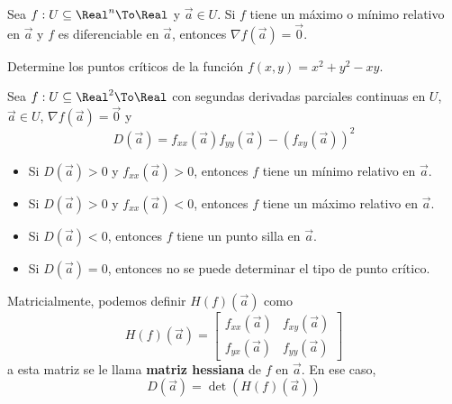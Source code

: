 \begin{frame}
  \begin{thm}
    Sea $f:U\subseteq\Real^n\To\Real$ y $\vec{a}\in U$. Si $f$ tiene un máximo o mínimo relativo en $\vec{a}$ y $f$ es diferenciable en $\vec{a}$, entonces $\nabla f(\vec{a})=\vec{0}$.
  \end{thm}
\end{frame}

\begin{frame}
  \begin{eg}
    Determine los puntos críticos de la función $f(x,y)=x^2+y^2-xy$.
  \end{eg}
\end{frame}

\begin{frame}
  \begin{thm}
    Sea $f:U\subseteq\Real^2\To\Real$ con segundas derivadas parciales continuas en $U$, $\vec{a}\in U$, $\nabla f(\vec{a})=\vec{0}$ y
      $$D(\vec{a})=f_{xx}(\vec{a})f_{yy}(\vec{a})-(f_{xy}(\vec{a}))^2$$
    \begin{itemize}
      \item<2-> Si $D(\vec{a})>0$ y $f_{xx}(\vec{a})>0$, entonces $f$ tiene un mínimo relativo en $\vec{a}$.
      \item<3-> Si $D(\vec{a})>0$ y $f_{xx}(\vec{a})<0$, entonces $f$ tiene un máximo relativo en $\vec{a}$.
      \item<4-> Si $D(\vec{a})<0$, entonces $f$ tiene un punto silla en $\vec{a}$.
      \item<5-> Si $D(\vec{a})=0$, entonces no se puede determinar el tipo de punto crítico.
    \end{itemize}
  \end{thm}
\end{frame}

\begin{frame}
  \begin{rem}
    Matricialmente, podemos definir $H(f)(\vec{a})$ como
    $$H(f)(\vec{a})=\left[\begin{array}{cc}f_{xx}(\vec{a}) & f_{xy}(\vec{a})\\ f_{yx}(\vec{a}) & f_{yy}(\vec{a})\end{array}\right]$$
    a esta matriz se le llama \textbf{matriz hessiana} de $f$ en $\vec{a}$. En ese caso, 
    $$D(\vec{a})=\det(H(f)(\vec{a}))$$
  \end{rem}
\end{frame}

